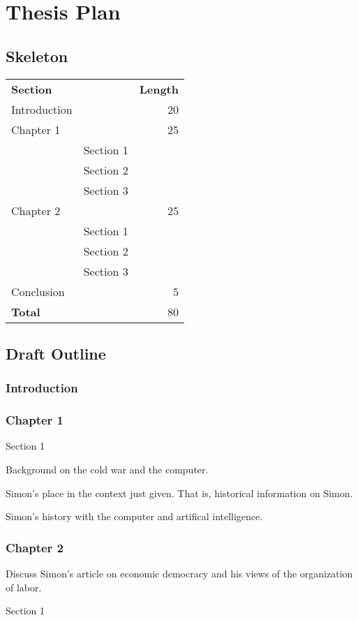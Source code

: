 \documentclass[paper=A4,portrait,twoside=true,twocolumn=true,headinclude=false,footinclude=false,fontsize=10,BCOR=15mm,DIV=13,pagesize=auto,titlepage=firstiscover,mpinclude=true,headings=twolinechapter,open=right,chapterprefix=false,numbers=noendperiod,headsepline=false,parskip=false]{scrbook}
\theoremstyle{definition}
\begin{document}
\chapter{Thesis Plan}
\label{sec:orgf401c6c}
\section{Skeleton}
\label{sec:org069f469}
\begin{center}
\begin{tabular}{llr}
\textbf{Section} &  & \textbf{Length}\\
Introduction &  & 20\\
Chapter 1 &  & 25\\
 & Section 1 & \\
 & Section 2 & \\
 & Section 3 & \\
Chapter 2 &  & 25\\
 & Section 1 & \\
 & Section 2 & \\
 & Section 3 & \\
Conclusion &  & 5\\
\textbf{Total} &  & 80\\
\end{tabular}
\end{center}
\section{Draft Outline}
\label{sec:org4c78789}
\subsection{Introduction}
\label{sec:org733e086}
\subsection{Chapter 1}
\label{sec:org2742b82}
\begin{labeling}[~]{Section 1} 
\item[Section 1] Background on the cold war and the computer. 
\item[Section 2] Simon's place in the context just given. That is, historical information on Simon.
\item[Section 3] Simon's history with the computer and artifical intelligence.
\end{labeling}
\subsection{Chapter 2}
\label{sec:org492410d}
Discuss Simon's article on economic democracy and his views of the
organization of labor. 
\begin{labeling}[~]{Section 1} 
\item[Section 1] 
\item[Section 2] 
\item[Section 3] 
\end{labeling}
\end{document}
